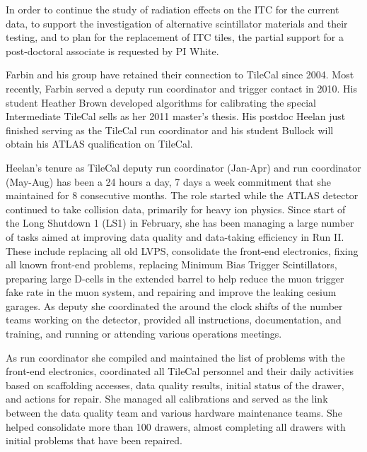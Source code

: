 In order to continue the study of radiation effects on the ITC for the current data, 
to support the investigation of alternative scintillator materials and their
testing, and to plan for the replacement of ITC tiles, the partial support for
a post-doctoral associate is requested by PI White.

 \label{sec:af_tile}

Farbin and his group have retained their connection to TileCal since
2004.  Most recently, Farbin served a deputy run coordinator and
trigger contact in 2010.  His student Heather Brown developed
algorithms for calibrating the special Intermediate TileCal sells as
her 2011 master's thesis. His postdoc Heelan just finished serving as
the TileCal run coordinator and his student Bullock will obtain his
ATLAS qualification on TileCal.

Heelan's tenure as TileCal deputy run coordinator (Jan-Apr) and run
coordinator (May-Aug) has been a 24 hours a day, 7 days a week
commitment that she maintained for 8 consecutive months.  The role
started while the ATLAS detector continued to take collision data,
primarily for heavy ion physics. Since start of the Long Shutdown 1
(LS1) in February, she has been managing a large number of tasks aimed
at improving data quality and data-taking efficiency in Run II. These
include replacing all old LVPS, consolidate the front-end electronics,
fixing all known front-end problems, replacing Minimum Bias Trigger
Scintillators, preparing large D-cells in the extended barrel to help
reduce the muon trigger fake rate in the muon system, and repairing
and improve the leaking cesium garages. As deputy she coordinated the
around the clock shifts of the number teams working on the detector,
provided all instructions, documentation, and training, and running or
attending various operations meetings. 

As run coordinator she compiled and maintained the list of problems
with the front-end electronics, coordinated all TileCal personnel and
their daily activities based on scaffolding accesses, data quality
results, initial status of the drawer, and actions for repair.  She
managed all calibrations and served as the link between the data
quality team and various hardware maintenance teams. She helped
consolidate more than 100 drawers, almost completing all drawers with
initial problems that have been repaired.

